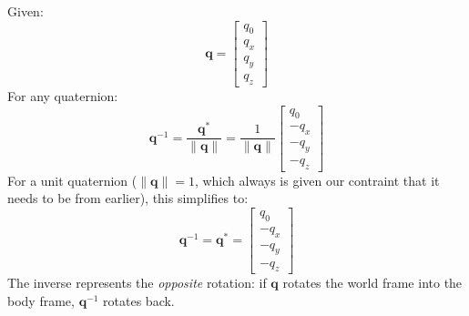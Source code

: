 \documentclass[12pt, a4paper]{article}
\begin{document}
Given:
\[
  \mathbf{q}
  = \begin{bmatrix} q_0 \\ q_x \\ q_y \\ q_z \end{bmatrix}
\]
For any quaternion:
\[
  \mathbf{q}^{-1} = \frac{\mathbf{q}^*}{\|\mathbf{q}\|}
  = \frac{1}{\|\mathbf{q}\|}
  \begin{bmatrix} q_0 \\ -q_x \\ -q_y \\ -q_z \end{bmatrix}
\]
For a unit quaternion ($\|\mathbf{q}\|=1$, which always is given our contraint that it needs to be from earlier), this simplifies to:
\[
  \mathbf{q}^{-1} = \mathbf{q}^*
  = \begin{bmatrix} q_0 \\ -q_x \\ -q_y \\ -q_z \end{bmatrix}
\]
The inverse represents the \emph{opposite} rotation: if $\mathbf{q}$ rotates
the world frame into the body frame, $\mathbf{q}^{-1}$ rotates back.
\end{document}
